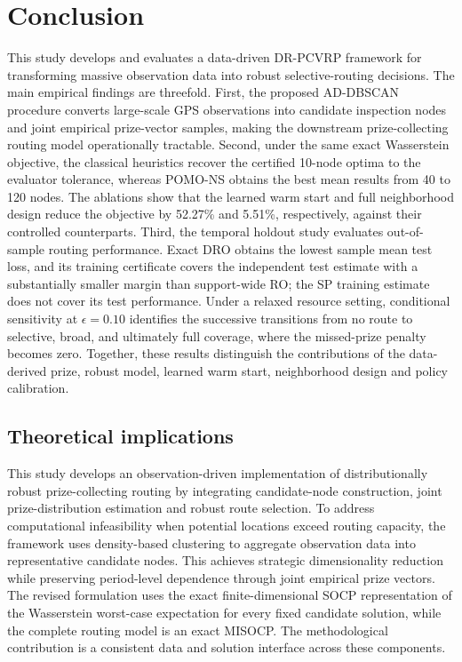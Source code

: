 \documentclass[preprint,12pt,authoryear]{elsarticle}
\theoremstyle{definition}
\begin{document}
\clearpage
\section{Conclusion}\label{sec6}

This study develops and evaluates a data-driven DR-PCVRP framework for transforming massive observation data into robust selective-routing decisions. 
The main empirical findings are threefold. 
First, the proposed AD-DBSCAN procedure converts large-scale GPS observations into candidate inspection nodes and joint empirical prize-vector samples, making the downstream prize-collecting routing model operationally tractable. 
Second, under the same exact Wasserstein objective, the classical heuristics recover the certified 10-node optima to the evaluator tolerance, whereas POMO-NS obtains the best mean results from 40 to 120 nodes. 
The ablations show that the learned warm start and full neighborhood design reduce the objective by 52.27\% and 5.51\%, respectively, against their controlled counterparts. 
Third, the temporal holdout study evaluates out-of-sample routing performance.
Exact DRO obtains the lowest sample mean test loss, and its training certificate covers the independent test estimate with a substantially smaller margin than support-wide RO; 
the SP training estimate does not cover its test performance. 
Under a relaxed resource setting, conditional sensitivity at $\epsilon=0.10$ identifies the successive transitions from no route to selective, broad, and ultimately full coverage, where the missed-prize penalty becomes zero. Together, these results distinguish the contributions of the data-derived prize, robust model, learned warm start, neighborhood design and policy calibration.


\subsection{Theoretical implications}

This study develops an observation-driven implementation of distributionally robust prize-collecting routing by integrating candidate-node construction, joint prize-distribution estimation and robust route selection. 
To address computational infeasibility when potential locations exceed routing capacity, the framework uses density-based clustering to aggregate observation data into representative candidate nodes. 
This achieves strategic dimensionality reduction while preserving period-level dependence through joint empirical prize vectors. 
The revised formulation uses the exact finite-dimensional SOCP representation of the Wasserstein worst-case expectation for every fixed candidate solution, while the complete routing model is an exact MISOCP. 
The methodological contribution is a consistent data and solution interface across these components.
\end{document}
